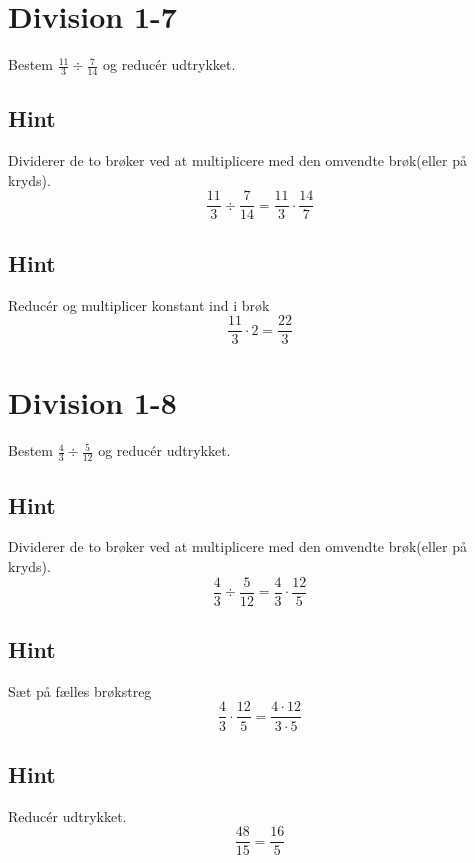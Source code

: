 \documentclass{article}
\newenvironment{exercise}[1]{\newpage\section{#1}}{}
\newcommand{\answerbox}[1]{\fbox{$#1$}}
\newcommand{\hint}{\subsection*{Hint}}
\begin{document}
\newpage

\begin{exercise}{Division 1-7}
	
	Bestem $\frac{11}{3} \div \frac{7}{14}$ og reducér udtrykket.
	
	\answerbox{ \frac{22}{3} }
	
	\hint
	
	Dividerer de to brøker ved at multiplicere med den omvendte brøk(eller på kryds).
	\[
	\frac{11}{3} \div \frac{7}{14} = \frac{11}{3} \cdot \frac{14}{7}
	\]
	
	\hint
	
	Reducér og multiplicer konstant ind i brøk
	\[
	\frac{11}{3} \cdot 2 = \frac{22}{3} 
	\]
	
	
\end{exercise}

\newpage

\begin{exercise}{Division 1-8}
	
	Bestem $\frac{4}{3} \div \frac{5}{12}$ og reducér udtrykket.
	
	\answerbox{\frac{16}{5} }
	
	\hint
	
	Dividerer de to brøker ved at multiplicere med den omvendte brøk(eller på kryds).
	\[
	\frac{4}{3} \div \frac{5}{12} = \frac{4}{3} \cdot \frac{12}{5}
	\]
	
	\hint
	
	Sæt på fælles brøkstreg
	\[
	\frac{4}{3} \cdot \frac{12}{5} = \frac{4 \cdot 12}{3 \cdot 5}
	\]
	
	\hint
	
	Reducér udtrykket.
	\[
	\frac{48}{15} = \frac{16}{5} 
	\]
	
\end{exercise}
\end{document}

